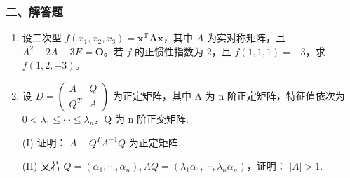 \documentclass[12pt, a4paper]{ctexart}
\begin{document}
\subsubsection*{二、解答题}

\begin{enumerate}[start=4]
    \item 设二次型 $ f(x_1, x_2, x_3) = \mathbf{x}^\mathrm{T} \mathbf{A} \mathbf{x} $，其中 $ A $ 为实对称矩阵，且 $ A^2 - 2A - 3E = \mathbf{O} $。若 $ f $ 的正惯性指数为 $ 2 $，且 $ f(1,1,1) = -3 $，求 $ f(1,2, -3) $。

    \item 设 $ D=\begin{pmatrix} A & Q \\ Q^{T} & A \end{pmatrix} $ 为正定矩阵，其中 A 为 n 阶正定矩阵，特征值依次为 $ 0 < \lambda_{1} \leq \cdots \leq \lambda_{n} $，Q 为 n 阶正交矩阵.
    
    (I) 证明： $ A-Q^{T}A^{-1}Q $ 为正定矩阵.
    
    (II) 又若 $ Q = (\alpha_{1}, \cdots, \alpha_{n}), AQ = (\lambda_{1} \alpha_{1}, \cdots, \lambda_{n} \alpha_{n}) $，证明： $ |A| > 1 $.
\end{enumerate}
\end{document}
